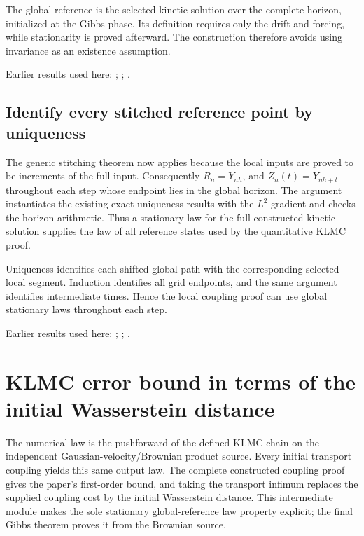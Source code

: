 \documentclass[11pt,a4paper]{report}
\begin{document}
The global reference is the selected kinetic solution over the complete horizon, initialized at the Gibbs phase. Its definition requires only the drift and forcing, while stationarity is proved afterward. The construction therefore avoids using invariance as an existence assumption.



Earlier results used here: \cite[Section~3.13.2]{LangevinLean2026ULASC}; \cite[Section~3.13.5]{LangevinLean2026ULASC}; \cite[Section~3.17.1]{LangevinLean2026ULASC}.
\subsection{\texorpdfstring{Identify every stitched reference point by uniqueness}{Identify every stitched reference point by uniqueness}}
\label{report-step-KineticLangevin-CanonicalGlobalSegments-lean-3}


The generic stitching theorem now applies because the local inputs are proved to be increments of the full input. Consequently \(R_n=Y_{nh}\), and \(Z_n(t)=Y_{nh+t}\) throughout each step whose endpoint lies in the global horizon. The argument instantiates the existing exact uniqueness results with the \(L^{2}\) gradient and checks the horizon arithmetic. Thus a stationary law for the full constructed kinetic solution supplies the law of all reference states used by the quantitative KLMC proof.



Uniqueness identifies each shifted global path with the corresponding selected local segment. Induction identifies all grid endpoints, and the same argument identifies intermediate times. Hence the local coupling proof can use global stationary laws throughout each step.



Earlier results used here: \cite[Section~3.13.2]{LangevinLean2026ULASC}; \cite[Section~3.13.5]{LangevinLean2026ULASC}; \cite[Section~3.17.1]{LangevinLean2026ULASC}.
\section{\texorpdfstring{KLMC error bound in terms of the initial Wasserstein distance}{KLMC error bound in terms of the initial Wasserstein distance}}
\label{proof-module-KineticLangevin-CanonicalKLMCBound-lean}


The numerical law is the pushforward of the defined KLMC chain on the independent Gaussian-velocity/\allowbreak{}Brownian product source. Every initial transport coupling yields this same output law. The complete constructed coupling proof gives the paper's first-order bound, and taking the transport infimum replaces the supplied coupling cost by the initial Wasserstein distance. This intermediate module makes the sole stationary global-reference law property explicit; the final Gibbs theorem proves it from the Brownian source.
\end{document}
